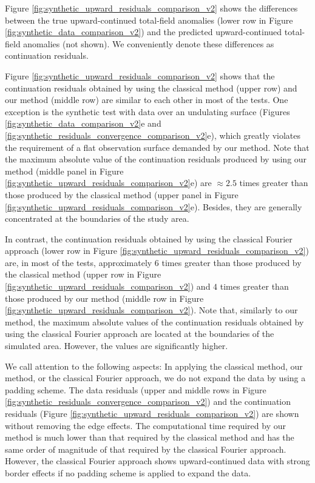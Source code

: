 Figure \ref{fig:synthetic_upward_residuals_comparison_v2} shows the differences
between the true upward-continued total-field anomalies (lower row in Figure
\ref{fig:synthetic_data_comparison_v2}) and the predicted upward-continued total-field 
anomalies (not shown). We conveniently denote these differences as continuation
residuals.


Figure \ref{fig:synthetic_upward_residuals_comparison_v2} shows that the continuation residuals 
obtained by using the classical method (upper row) and our method (middle row) are 
similar to each other in most of the tests.
One exception is the synthetic test with data over an undulating surface 
(Figures \ref{fig:synthetic_data_comparison_v2}e and 
\ref{fig:synthetic_residuals_convergence_comparison_v2}e), which greatly violates the 
requirement of a flat observation surface demanded by our method.
Note that the maximum absolute value of the continuation residuals produced by using our 
method (middle panel in Figure \ref{fig:synthetic_upward_residuals_comparison_v2}e) 
are $\approx 2.5$ times greater than those produced by the classical method 
(upper panel in Figure \ref{fig:synthetic_upward_residuals_comparison_v2}e).
Besides, they are generally concentrated at the boundaries of the study area.


In contrast, the continuation residuals obtained by using the 
classical Fourier approach (lower row in Figure \ref{fig:synthetic_upward_residuals_comparison_v2})
are, in most of the tests, approximately $6$ times greater than those produced by the classical method 
(upper row in Figure \ref{fig:synthetic_upward_residuals_comparison_v2}) and $4$ times greater than
those produced by our method (middle row in Figure \ref{fig:synthetic_upward_residuals_comparison_v2}).
Note that, similarly to our method, the maximum absolute values of the continuation residuals 
obtained by using the classical Fourier approach are located at the boundaries of the simulated area.
However, the values are significantly higher.

We call attention to the following aspects:
In applying the classical method, our method, or the classical Fourier approach, we do not expand 
the data by using a padding scheme.
The data residuals (upper and middle rows in Figure 
\ref{fig:synthetic_residuals_convergence_comparison_v2}) 
and the continuation residuals (Figure \ref{fig:synthetic_upward_residuals_comparison_v2}) are
shown without removing the edge effects. 
The computational time required by our method is much lower than that required by the classical method
and has the same order of magnitude of that required by the classical Fourier approach.
However, the classical Fourier approach shows upward-continued data with strong border effects 
if no padding scheme is applied to expand the data. 


